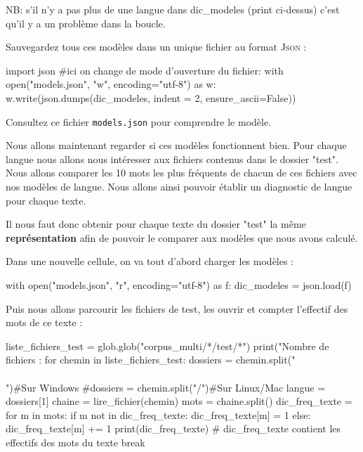NB: s'il n'y a pas plus de une langue dans dic\_modeles (print ci-dessus) c'est qu'il y a un problème dans la boucle.

 Sauvegardez tous ces modèles dans un unique fichier au format \textsc{Json} :

\begin{python}
import json
#ici on change de mode d'ouverture du fichier:
with open("models.json", "w", encoding="utf-8") as w:
  w.write(json.dumps(dic_modeles, indent = 2, ensure_ascii=False))
\end{python}

Consultez ce fichier \texttt{models.json} pour comprendre le modèle.

\vspace{0.5cm}
\vspace{0.5cm}

 Nous allons maintenant regarder si ces modèles fonctionnent bien.
 Pour chaque langue nous allons nous intéresser aux fichiers contenus dans le dossier  "test".
 Nous allons comparer les 10 mots les plus fréquents de chacun de ces fichiers avec nos modèles de langue.
 Nous allons ainsi pouvoir établir un diagnostic de langue pour chaque texte.

 Il nous faut donc obtenir pour chaque texte du dossier "test" la même \textbf{représentation} afin de pouvoir le comparer aux modèles que nous avons calculé.

 Dans une nouvelle cellule, on va tout d'abord charger les modèles :

\begin{python}
with open("models.json", "r", encoding="utf-8") as f:
  dic_modeles = json.load(f)
\end{python}

Puis nous allons parcourir les fichiers de test, les ouvrir et compter l'effectif des mots de ce texte :

\begin{python}
liste_fichiers_test = glob.glob("corpus_multi/*/test/*")
print("Nombre de fichiers : %
for chemin in liste_fichiers_test:
  dossiers = chemin.split("\\\\")#Sur Windows
  #dossiers = chemin.split("/")#Sur Linux/Mac
  langue = dossiers[1]
  chaine = lire_fichier(chemin)
  mots = chaine.split()
  dic_freq_texte = {}
  for m in mots:
    if m not in dic_freq_texte:
      dic_freq_texte[m] = 1
    else:
      dic_freq_texte[m] += 1
  print(dic_freq_texte)
  # dic_freq_texte contient les effectifs des mots du texte
  break
\end{python}

